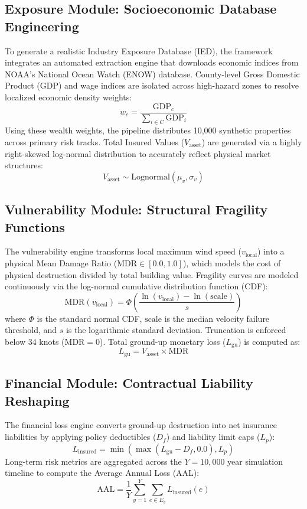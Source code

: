\documentclass[11pt,article]{article}
\begin{document}
\subsection{Exposure Module: Socioeconomic Database Engineering}
To generate a realistic Industry Exposure Database (IED), the framework integrates an automated extraction engine that downloads economic indices from NOAA's National Ocean Watch (ENOW) database. County-level Gross Domestic Product (GDP) and wage indices are isolated across high-hazard zones to resolve localized economic density weights:
\begin{equation}
w_c = \frac{\text{GDP}_c}{\sum_{i \in C} \text{GDP}_i}
\end{equation}
Using these wealth weights, the pipeline distributes 10,000 synthetic properties across primary risk tracks. Total Insured Values ($V_{\text{asset}}$) are generated via a highly right-skewed log-normal distribution to accurately reflect physical market structures:
\begin{equation}
V_{\text{asset}} \sim \text{Lognormal}(\mu_{v}, \sigma_{v})
\end{equation}

\subsection{Vulnerability Module: Structural Fragility Functions}
The vulnerability engine transforms local maximum wind speed ($v_{\text{local}}$) into a physical Mean Damage Ratio ($\text{MDR} \in [0.0, 1.0]$), which models the cost of physical destruction divided by total building value. Fragility curves are modeled continuously via the log-normal cumulative distribution function (CDF):
\begin{equation}
\text{MDR}(v_{\text{local}}) = \Phi\left(\frac{\ln(v_{\text{local}}) - \ln(\text{scale})}{s}\right)
\end{equation}
where $\Phi$ is the standard normal CDF, $\text{scale}$ is the median velocity failure threshold, and $s$ is the logarithmic standard deviation. Truncation is enforced below 34 knots ($\text{MDR} = 0$). Total ground-up monetary loss ($L_{\text{gu}}$) is computed as:
\begin{equation}
L_{\text{gu}} = V_{\text{asset}} \times \text{MDR}
\end{equation}

\subsection{Financial Module: Contractual Liability Reshaping}
The financial loss engine converts ground-up destruction into net insurance liabilities by applying policy deductibles ($D_f$) and liability limit caps ($L_p$):
\begin{equation}
L_{\text{insured}} = \min\left( \max\left(L_{\text{gu}} - D_f, 0.0\right), L_p \right)
\end{equation}
Long-term risk metrics are aggregated across the $Y = 10,000$ year simulation timeline to compute the Average Annual Loss (AAL):
\begin{equation}
\text{AAL} = \frac{1}{Y} \sum_{y=1}^{Y} \sum_{e \in E_y} L_{\text{insured}}(e)
\end{equation}
\end{document}
